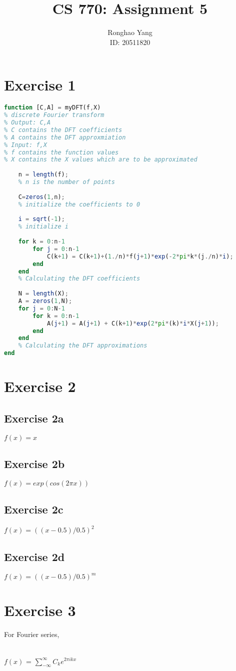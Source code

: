 \documentclass[11pt]{article} %
\title{CS 770: Assignment 5}
\author{Ronghao Yang\\ID: 20511820}
\begin{document}
\maketitle

\section{Exercise 1}
\begin{lstlisting}[language=Octave]
function [C,A] = myDFT(f,X)
% discrete Fourier transform
% Output: C,A
% C contains the DFT coefficients
% A contains the DFT approxmiation
% Input: f,X
% f contains the function values
% X contains the X values which are to be approximated
    
    n = length(f);
    % n is the number of points
    
    C=zeros(1,n);
    % initialize the coefficients to 0
    
    i = sqrt(-1);
    % initialize i
    
    for k = 0:n-1
        for j = 0:n-1
            C(k+1) = C(k+1)+(1./n)*f(j+1)*exp(-2*pi*k*(j./n)*i);
        end
    end
    % Calculating the DFT coefficients
    
    N = length(X);
    A = zeros(1,N);
    for j = 0:N-1
        for k = 0:n-1
            A(j+1) = A(j+1) + C(k+1)*exp(2*pi*(k)*i*X(j+1));            
        end
    end
    % Calculating the DFT approximations
end
\end{lstlisting}
\section{Exercise 2}
\subsection{Exercise 2a}
$f(x)=x$
\subsection{Exercise 2b}
$f(x)=exp(cos(2\pi x))$
\subsection{Exercise 2c}
$f(x)=((x-0.5)/0.5)^{2}$
\subsection{Exercise 2d}
$f(x)=((x-0.5)/0.5)^{m}$

\section{Exercise 3}
For Fourier series,\\\\
\centerline{$f(x)$ = $\sum_{-\infty}^{\infty}C_{k}e^{2\pi i k x}$}
\end{document}
